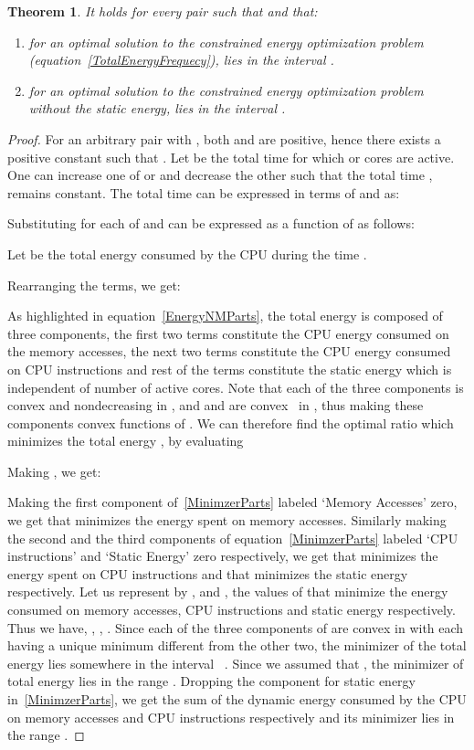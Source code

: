 \documentclass[11pt, letterpaper]{article}
\newtheorem{theorem}{Theorem}
\begin{document}
\begin{theorem}\label{TheoremRange}
It holds for every pair  such that  and  that:
 \begin{enumerate}
 \item for an optimal solution  to the constrained energy optimization problem (equation~\ref{TotalEnergyFrequecy}),  lies in the interval .
  \item for an optimal solution  to the constrained energy optimization problem without the static energy,
   lies in the interval .
 \end{enumerate}
\end{theorem}
\begin{proof}
 For an arbitrary pair  with , both  and  are positive, hence there exists a positive constant  such that .
 Let  be the total time for which  or  cores are active. One can increase one of  or  and decrease the other such that the total time , remains constant. 
 The total time  can be expressed in terms of  and  as:
 
Substituting  for  each of  and  can be expressed as a function of  as follows:


Let  be the total energy consumed by the CPU during the time .

Rearranging the terms, we get:

As highlighted in equation~\ref{EnergyNMParts}, the total energy  is composed of three components, the first two terms constitute the CPU energy consumed on the memory accesses, the next two terms constitute the CPU energy consumed on CPU instructions and rest of the terms constitute the static energy which is independent of number of active cores.
Note that each of the three components is convex and nondecreasing in , and  and  are convex~\cite{Boyd} in , thus making these components convex functions of .
We can therefore find the optimal ratio  which minimizes the total energy , by evaluating 



Making , we get:

Making the first component of~\ref{MinimzerParts} labeled `Memory Accesses' zero, we get  that minimizes the energy spent on memory accesses. Similarly making the  second and the third components of equation~\ref{MinimzerParts} labeled `CPU instructions' and `Static Energy' zero respectively, we get  that minimizes the energy spent on CPU instructions and  that minimizes the static energy respectively.
Let us represent by ,  and , the values of  that minimize the energy consumed on memory accesses, CPU instructions and static energy respectively.
Thus we have, , ,  .
Since each of the three components of  are convex in  with each having a unique minimum different from the other two, the minimizer of the total energy lies somewhere in the interval ~\cite{Boyd}. Since we assumed that , the minimizer of total energy lies in the range .
Dropping the component for static energy in~\ref{MinimzerParts}, we get the sum of the  dynamic energy consumed by the CPU on memory accesses and CPU instructions respectively and its minimizer lies in the range .
\end{proof}
\end{document}
